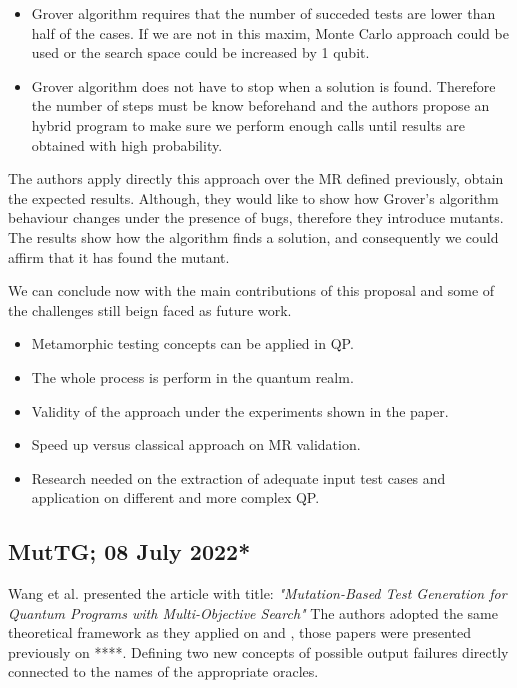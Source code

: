 \begin{itemize}
\begin{itemize}
    \item Grover algorithm requires that the number of succeded tests are lower than half of the cases. If we are not in this maxim, Monte Carlo approach could be used or the search space could be increased by 1 qubit.
    \item Grover algorithm does not have to stop when a solution is found. Therefore the number of steps must be know beforehand and the authors propose an hybrid program to make sure we perform enough calls until results are obtained with high probability.
\end{itemize}

The authors apply directly this approach over the MR defined previously, obtain the expected results. Although, they would like to show how Grover's algorithm behaviour changes under the presence of bugs, therefore they introduce mutants. The results show how the algorithm finds a solution, and consequently we could affirm that it has found the mutant.

We can conclude now with the main contributions of this proposal and some of the challenges still beign faced as future work.

\begin{itemize}
    \item Metamorphic testing concepts can be applied in QP.
    \item The whole process is perform in the quantum realm.
    \item Validity of the approach under the experiments shown in the paper.
    \item Speed up versus classical approach on MR validation.
    \item Research needed on the extraction of adequate input test cases and application on different and more complex QP.
\end{itemize}

\vspace{15pt}
\subsection{MutTG; 08 July 2022*}

Wang et al. presented the article with title: \textit{"Mutation-Based Test Generation for Quantum Programs with Multi-Objective Search"}\cite{wang2022mutation} The authors adopted the same theoretical framework as they applied on \cite{ali2021assessing} and \cite{wang2021quito}, those papers were presented previously on ****. Defining two new concepts of possible output failures directly connected to the names of the appropriate oracles.\newline


\end{itemize}
